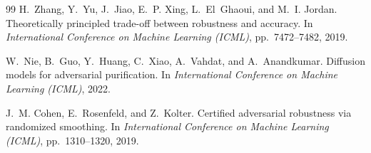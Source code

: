 \documentclass[12pt,a4paper]{article}
\begin{document}
\begin{thebibliography}{99}
H.~Zhang, Y.~Yu, J.~Jiao, E.~P. Xing, L.~El~Ghaoui, and M.~I. Jordan.
\newblock Theoretically principled trade-off between robustness and accuracy.
\newblock In \textit{International Conference on Machine Learning (ICML)}, pp.~7472--7482, 2019.

W.~Nie, B.~Guo, Y.~Huang, C.~Xiao, A.~Vahdat, and A.~Anandkumar.
\newblock Diffusion models for adversarial purification.
\newblock In \textit{International Conference on Machine Learning (ICML)}, 2022.

J.~M. Cohen, E.~Rosenfeld, and Z.~Kolter.
\newblock Certified adversarial robustness via randomized smoothing.
\newblock In \textit{International Conference on Machine Learning (ICML)}, pp.~1310--1320, 2019.

\end{thebibliography}
\end{document}
